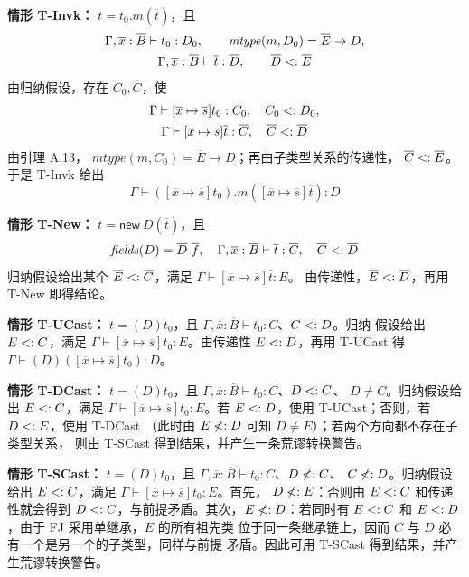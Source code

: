 \begin{taplauthorsolutionentrybox}
\textbf{情形 T-Invk：}
\(t=t_0.m(\overline t)\)，且
\[
\begin{gathered}
 \Gamma,\overline x:\overline B\vdash t_0:D_0,
 \qquad \mathit{mtype}(m,D_0)=\overline E\to D,\\
 \Gamma,\overline x:\overline B\vdash\overline t:\overline D,
 \qquad \overline D\mathrel{<:}\overline E
\end{gathered}
\]
由归纳假设，存在 \(C_0,\overline C\)，使
\[
\begin{gathered}
 \Gamma\vdash[\overline x\mapsto\overline s]t_0:C_0,
 \quad C_0\mathrel{<:} D_0,\\
 \Gamma\vdash[\overline x\mapsto\overline s]\overline t:\overline C,
 \quad \overline C\mathrel{<:}\overline D
\end{gathered}
\]
由引理 A.13，
\(\mathit{mtype}(m,C_0)=\overline E\to D\)；再由子类型关系的传递性，
\(\overline C\mathrel{<:}\overline E\)。于是 T-Invk 给出
\[
 \Gamma\vdash
 ([\overline x\mapsto\overline s]t_0).m
 ([\overline x\mapsto\overline s]\overline t):D
\]

\textbf{情形 T-New：}
\(t=\mathsf{new}\ D(\overline t)\)，且
\[
 \mathit{fields}(D)=\overline D\ \overline f,
 \quad
 \Gamma,\overline x:\overline B\vdash\overline t:\overline C,
 \quad
 \overline C\mathrel{<:}\overline D
\]
归纳假设给出某个 \(\overline E\mathrel{<:}\overline C\)，满足
\(\Gamma\vdash[\overline x\mapsto\overline s]\overline t:\overline E\)。
由传递性，\(\overline E\mathrel{<:}\overline D\)，再用 T-New 即得结论。

\textbf{情形 T-UCast：}
\(t=(D)t_0\)，且
\(\Gamma,\overline x:\overline B\vdash t_0:C\)、\(C\mathrel{<:} D\)。归纳
假设给出 \(E\mathrel{<:} C\)，满足
\(\Gamma\vdash[\overline x\mapsto\overline s]t_0:E\)。由传递性
\(E\mathrel{<:} D\)，再用 T-UCast 得
\(\Gamma\vdash(D)([\overline x\mapsto\overline s]t_0):D\)。

\textbf{情形 T-DCast：}
\(t=(D)t_0\)，且
\(\Gamma,\overline x:\overline B\vdash t_0:C\)、\(D\mathrel{<:} C\)、
\(D\ne C\)。归纳假设给出 \(E\mathrel{<:} C\)，满足
\(\Gamma\vdash[\overline x\mapsto\overline s]t_0:E\)。若
\(E\mathrel{<:} D\)，使用 T-UCast；否则，若 \(D\mathrel{<:} E\)，使用 T-DCast
（此时由 \(E\mathrel{\not<:} D\) 可知 \(D\ne E\)）；若两个方向都不存在子类型关系，
则由 T-SCast 得到结果，并产生一条荒谬转换警告。

\textbf{情形 T-SCast：}
\(t=(D)t_0\)，且
\(\Gamma,\overline x:\overline B\vdash t_0:C\)、\(D\mathrel{\not<:} C\)、
\(C\mathrel{\not<:} D\)。归纳假设给出 \(E\mathrel{<:} C\)，满足
\(\Gamma\vdash[\overline x\mapsto\overline s]t_0:E\)。首先，
\(D\mathrel{\not<:} E\)：否则由 \(E\mathrel{<:} C\) 和传递性就会得到
\(D\mathrel{<:} C\)，与前提矛盾。其次，\(E\mathrel{\not<:} D\)：若同时有
\(E\mathrel{<:} C\) 和 \(E\mathrel{<:} D\)，由于 FJ 采用单继承，\(E\) 的所有祖先类
位于同一条继承链上，因而 \(C\) 与 \(D\) 必有一个是另一个的子类型，同样与前提
矛盾。因此可用 T-SCast 得到结果，并产生荒谬转换警告。


\end{taplauthorsolutionentrybox}
